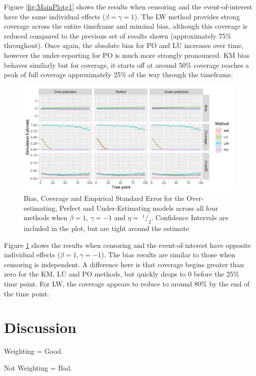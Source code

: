 \documentclass[
]{article}
\newcommand{\sfrac}[2]{\;^{#1}/_{#2}}
\begin{document}
Figure \ref{fig:MainPlotg1} shows the results when censoring and the event-of-interest have the same individual effects (\(\beta=\gamma=1\)). The LW method provides strong coverage across the entire timeframe and miminal bias, although this coverage is reduced compared to the previous set of results shown (approximately 75\% throughout). Once again, the absolute bias for PO and LU increases over time, however the under-reporting for PO is much more strongly pronounced. KM bias behaves similarly but for coverage, it starts off at around 50\% coverage reaches a peak of full coverage approximately 25\% of the way through the timeframe.
\begin{figure}
\includegraphics[width=54.68in]{figure/IPCW_Logistic/MainPlot_b(1)_g(-1)_e(0.5)} \caption{Bias, Coverage and Empirical Standard Error for the Over-estimating, Perfect and Under-Estimating models across all four methods when $\beta=1$, $\gamma=-1$ and $\eta=\sfrac{1}{2}$. Confidence Intervals are included in the plot, but are tight around the estimate}\label{fig:MainPlotg2}
\end{figure}
Figure \ref{fig:MainPlotg2} shows the results when censoring and the event-of-interest have opposite individual effects (\(\beta=1, \gamma=-1\)). The bias results are similar to those when censoring is independent. A difference here is that coverage begins greater than zero for the KM, LU and PO methods, but quickly drops to 0 before the 25\% time point. For LW, the coverage appears to reduce to around 80\% by the end of the time point.

\hypertarget{discussion-1}{%
\section{Discussion}\label{discussion-1}}

Weighting = Good.

Not Weighting = Bad.
\end{document}
